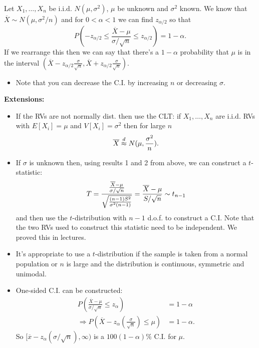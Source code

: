 \documentclass[10pt, two column]{article}
\begin{document}
Let $X_{1}, \dots, X_{n}$ be i.i.d. $N(\mu, \sigma^{2})$, $\mu$ be unknown and $\sigma^{2}$ known. We know that $\overline{X} \sim N(\mu, \sigma^{2}/n)$ and for $0 < \alpha < 1$ we can find $z_{\alpha/2}$ so that 
\[ P \left( - z_{\alpha/2} \leq \frac{\overline{X} - \mu}{\sigma / \sqrt{n}} \leq z_{\alpha/2} \right) = 1 - \alpha. \]
If we rearrange this then we can say that there's a $1 - \alpha$ probability that $\mu$ is in the interval $(\overline{X} - z_{\alpha/2} \frac{\sigma}{\sqrt{n}}, \overline{X} + z_{\alpha/2} \frac{\sigma}{\sqrt{n}})$.
\begin{itemize}
\item Note that you can decrease the C.I. by increasing $n$ or decreasing $\sigma$.
\end{itemize}

{\bf Extensions:}
\begin{itemize}
\item If the RVs are not normally dist. then use the CLT: if $X_{1}, \dots, X_{n}$ are i.i.d. RVs with $E[X_{i}] = \mu$ and $V[X_{i}] = \sigma^{2}$ then for large $n$ \vspace{-5pt}
\[
\overline{X} \stackrel{d}{\approx} N(\mu, \frac{\sigma^{2}}{n}). \vspace{-5pt}
\]
\item If $\sigma$ is unknown then, using results 1 and 2 from above, we can construct a $t$-statistic:\vspace{-6pt} 
\[T = \frac{\frac{\overline{X} - \mu}{\sigma / \sqrt{n}}}{\sqrt{\frac{(n-1)S^{2}}{\sigma^{2}(n-1)}}} = \frac{\overline{X} - \mu}{S / \sqrt{n}} \sim t_{n-1} \vspace{-6pt} \]
and then use the $t$-distribution with $n-1$ d.o.f. to construct a C.I. Note that the two RVs used to construct this statistic need to be independent. We proved this in lectures. 
\item It's appropriate to use a $t$-distribution if the sample is taken from a normal population or $n$ is large and the distribution is continuous, symmetric and unimodal. 
\item One-sided C.I. can be constructed: 
\begin{align*}
P \left( \frac{\overline{X} - \mu}{\sigma / \sqrt{n}} \leq z_{\alpha} \right) &= 1 - \alpha \\
\Rightarrow P \left( \overline{X} - z_{\alpha} \left( \frac{\sigma}{\sqrt{n}} \right) \leq \mu  \right) &= 1 - \alpha.
\end{align*}
So $[\overline{x} - z_{\alpha}(\sigma / \sqrt{n}), \infty)$ is a $100(1-\alpha) \%$ C.I. for $\mu$. 
\end{itemize}
\end{document}
